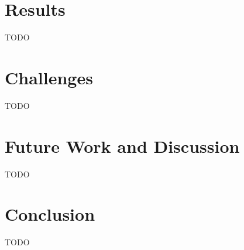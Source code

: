 \documentclass{sigchi}
\begin{document}
\section{Results}
TODO

\section{Challenges}
TODO

\section{Future Work and Discussion}
TODO

\section{Conclusion}
TODO
\cite{Schwartz:1995:GBF}

\balance{}



\end{document}
